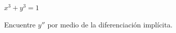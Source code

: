 \setcounter{enumi}{22}
\item $x^3 + y^3 = 1$
\par
Encuentre $y''$ por medio de la diferenciación implícita.

